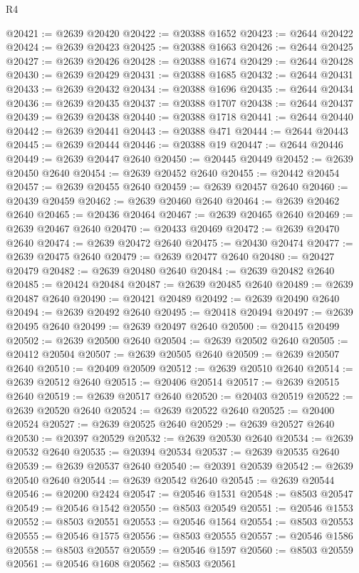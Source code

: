 \begin{lexlean}{R4}
\begin{coremodule}
@20421 := @2639 @20420
@20422 := @20388 @1652
@20423 := @2644 @20422
@20424 := @2639 @20423
@20425 := @20388 @1663
@20426 := @2644 @20425
@20427 := @2639 @20426
@20428 := @20388 @1674
@20429 := @2644 @20428
@20430 := @2639 @20429
@20431 := @20388 @1685
@20432 := @2644 @20431
@20433 := @2639 @20432
@20434 := @20388 @1696
@20435 := @2644 @20434
@20436 := @2639 @20435
@20437 := @20388 @1707
@20438 := @2644 @20437
@20439 := @2639 @20438
@20440 := @20388 @1718
@20441 := @2644 @20440
@20442 := @2639 @20441
@20443 := @20388 @471
@20444 := @2644 @20443
@20445 := @2639 @20444
@20446 := @20388 @19
@20447 := @2644 @20446
@20449 := @2639 @20447 @2640
@20450 := @20445 @20449
@20452 := @2639 @20450 @2640
@20454 := @2639 @20452 @2640
@20455 := @20442 @20454
@20457 := @2639 @20455 @2640
@20459 := @2639 @20457 @2640
@20460 := @20439 @20459
@20462 := @2639 @20460 @2640
@20464 := @2639 @20462 @2640
@20465 := @20436 @20464
@20467 := @2639 @20465 @2640
@20469 := @2639 @20467 @2640
@20470 := @20433 @20469
@20472 := @2639 @20470 @2640
@20474 := @2639 @20472 @2640
@20475 := @20430 @20474
@20477 := @2639 @20475 @2640
@20479 := @2639 @20477 @2640
@20480 := @20427 @20479
@20482 := @2639 @20480 @2640
@20484 := @2639 @20482 @2640
@20485 := @20424 @20484
@20487 := @2639 @20485 @2640
@20489 := @2639 @20487 @2640
@20490 := @20421 @20489
@20492 := @2639 @20490 @2640
@20494 := @2639 @20492 @2640
@20495 := @20418 @20494
@20497 := @2639 @20495 @2640
@20499 := @2639 @20497 @2640
@20500 := @20415 @20499
@20502 := @2639 @20500 @2640
@20504 := @2639 @20502 @2640
@20505 := @20412 @20504
@20507 := @2639 @20505 @2640
@20509 := @2639 @20507 @2640
@20510 := @20409 @20509
@20512 := @2639 @20510 @2640
@20514 := @2639 @20512 @2640
@20515 := @20406 @20514
@20517 := @2639 @20515 @2640
@20519 := @2639 @20517 @2640
@20520 := @20403 @20519
@20522 := @2639 @20520 @2640
@20524 := @2639 @20522 @2640
@20525 := @20400 @20524
@20527 := @2639 @20525 @2640
@20529 := @2639 @20527 @2640
@20530 := @20397 @20529
@20532 := @2639 @20530 @2640
@20534 := @2639 @20532 @2640
@20535 := @20394 @20534
@20537 := @2639 @20535 @2640
@20539 := @2639 @20537 @2640
@20540 := @20391 @20539
@20542 := @2639 @20540 @2640
@20544 := @2639 @20542 @2640
@20545 := @2639 @20544
@20546 := @20200 @2424
@20547 := @20546 @1531
@20548 := @8503 @20547
@20549 := @20546 @1542
@20550 := @8503 @20549
@20551 := @20546 @1553
@20552 := @8503 @20551
@20553 := @20546 @1564
@20554 := @8503 @20553
@20555 := @20546 @1575
@20556 := @8503 @20555
@20557 := @20546 @1586
@20558 := @8503 @20557
@20559 := @20546 @1597
@20560 := @8503 @20559
@20561 := @20546 @1608
@20562 := @8503 @20561

\end{coremodule}
\end{lexlean}
